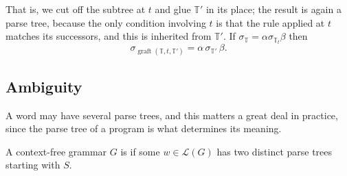 \documentclass[a4paper]{scrartcl}
\newcommand{\graft}{\operatorname{graft}}
\newcommand{\lang}{\mathcal{L}}
\begin{document}
That is, we cut off the subtree at $t$ and glue $\mathbb T'$ in its place; the result is again a parse tree, because the only condition involving $t$ is that the rule applied at $t$ matches its successors, and this is inherited from $\mathbb T'$. If $\sigma_{\mathbb T} = \alpha\sigma_{\mathbb T_t}\beta$ then
$$\sigma_{\graft(\mathbb T, t, \mathbb T')} = \alpha\, \sigma_{\mathbb T'}\, \beta.$$

\subsection{Ambiguity}

A word may have several parse trees, and this matters a great deal in practice, since the parse tree of a program is what determines its meaning.

\begin{definition}
	A context-free grammar $G$ is  if some $w \in \lang(G)$ has two distinct parse trees starting with $S$.
\end{definition}
\end{document}
